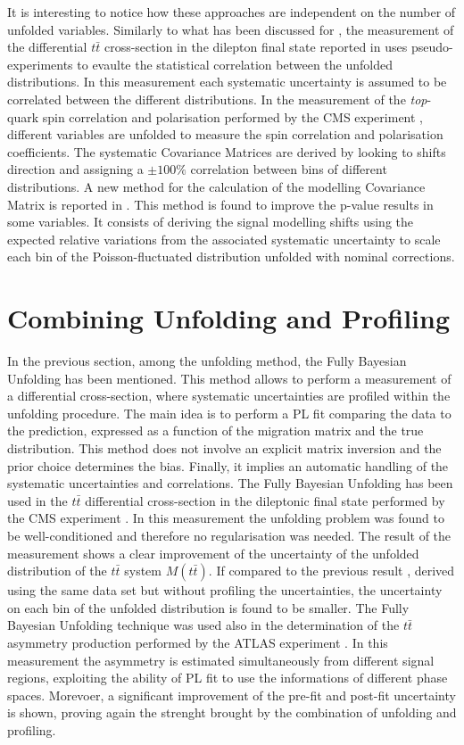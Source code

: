 \documentclass[12pt]{article}
\begin{document}
It is interesting to notice how these approaches are independent on the number of unfolded variables.
Similarly to what has been discussed for \cite{atlas_diffrential}, the measurement of the differential $t\bar{t}$ cross-section in the dilepton final state reported in \cite{atlas_diff_dilep} uses pseudo-experiments to evaulte the statistical correlation between the unfolded distributions. In this measurement each systematic uncertainty is assumed to be correlated between the different distributions. 
In the measurement of the \emph{top}-quark spin correlation and polarisation performed by the CMS experiment \cite{PhysRevD.100.072002}, different variables are unfolded to measure the spin correlation and polarisation coefficients. The systematic Covariance Matrices are derived by looking to shifts direction and assigning a $\pm100\%$ correlation between bins of different distributions.
A new method for the calculation of the modelling Covariance Matrix is reported in \cite{allhad_atlas}. This method is found to improve the p-value results in some variables. It consists of deriving the signal modelling shifts using the expected relative variations from the associated systematic uncertainty to scale each bin of the Poisson-fluctuated distribution unfolded with nominal corrections.

\section{Combining Unfolding and Profiling}
In the previous section, among the unfolding method, the Fully Bayesian Unfolding \cite{choudalakis2012fully} has been mentioned. This method allows to perform a measurement of a differential cross-section, where systematic uncertainties are profiled within the unfolding procedure. 
The main idea is to perform a PL fit comparing the data to the prediction, expressed as a function of the migration matrix and the true distribution. This method does not involve an explicit matrix inversion and the prior choice determines the bias. Finally, it implies an automatic handling of the systematic uncertainties and correlations.
The Fully Bayesian Unfolding has been used in the $t\bar{t}$ differential cross-section in the dileptonic final state performed by the CMS experiment \cite{2020135263}. In this measurement the unfolding problem was found to be well-conditioned and therefore no regularisation was needed. 
The result of the measurement shows a clear improvement of the uncertainty of the unfolded distribution of the $t\bar{t}$ system $M(t\bar{t})$. If compared to the previous result \cite{CMS_diff_to_compare}, derived using the same data set but without profiling the uncertainties, the uncertainty on each bin of the unfolded distribution is found to be smaller.
The Fully Bayesian Unfolding technique was used also in the determination of the $t\bar{t}$ asymmetry production performed by the ATLAS experiment \cite{ATLAS-CONF-2019-026}. In this measurement the asymmetry is estimated simultaneously from different signal regions, exploiting the ability of PL fit to use the informations of different phase spaces. Morevoer, a significant improvement of the pre-fit and post-fit uncertainty is shown, proving again the strenght brought by the combination of unfolding and profiling. 
\end{document}
